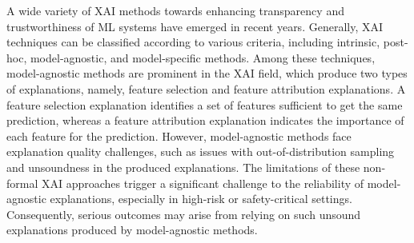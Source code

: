 A wide variety of XAI methods towards enhancing transparency and trustworthiness of ML systems
have emerged in recent years.
%
Generally, XAI techniques can be classified according to various criteria, including intrinsic, 
post-hoc, model-agnostic, and model-specific methods.
%
Among these techniques, model-agnostic methods are prominent in the XAI field,
which produce two types of explanations, namely, feature selection and
feature attribution explanations.
%
A feature selection explanation identifies a set of features sufficient to
get the same prediction, 
whereas a feature attribution explanation indicates the importance of each feature for the prediction.
%
However, model-agnostic methods face explanation quality challenges, such as issues with 
out-of-distribution sampling and unsoundness in the produced explanations.
%
The limitations of these non-formal XAI approaches trigger a significant challenge 
to the reliability of model-agnostic explanations, especially in high-risk or 
safety-critical settings.
%
Consequently, serious outcomes may arise from relying on such unsound
explanations produced by model-agnostic methods.

